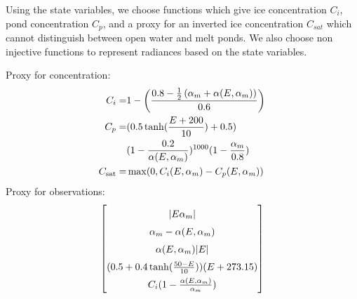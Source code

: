 \documentclass[landscape,a0paper,fontscale=0.3]{baposter} %
\newcommand{\compresslist}{ %
\setlength{\itemsep}{1pt}
\setlength{\parskip}{0pt}
\setlength{\parsep}{0pt}
}
\newcommand{\am}{\alpha_m}
\newcommand{\csat}{C_{\text{sat}}}
\begin{document}
\begin{poster}
{{Using the state variables, we choose functions which give ice concentration $C_i$, pond concentration $C_p$, and a proxy for an inverted ice concentration $C_{sat}$ which cannot distinguish between open water and melt ponds. We also choose non injective functions to represent radiances based on the state variables.  

\begin{multicols}{2}
Proxy for concentration:\\
\begin{align*}\compresslist
C_i = &1-\left(\frac{0.8-\frac{1}{2}\left( \alpha_m+\alpha(E,\alpha_m)\right)}{0.6}\right) \\
C_p = &(0.5\tanh(\frac{E+200}{10})+0.5)\\
   & (1-\frac{0.2}{\alpha(E,\am)})^{1000}(1-\frac{\am}{0.8}) \\
\csat = &\max(0,C_i(E,\am)-C_p(E,\am))
\end{align*}
\vfill\null
\columnbreak
Proxy for observations:\\
\begin{equation*}
\begingroup
\renewcommand*{\arraystretch}{1.5}
\begin{bmatrix}
|E\alpha_m|\\ 
\alpha_m-\alpha(E,\alpha_m) \\
\alpha(E,\alpha_m)|E|\\
(0.5+0.4\tanh(\frac{50-E}{10}))(E+273.15)\\
C_i (1-\frac{\alpha(E,\alpha_m)}{\alpha_m})
\end{bmatrix}
\endgroup
\end{equation*}
\end{multicols}

}
}



\end{poster}
\end{document}
